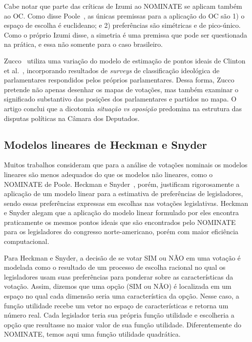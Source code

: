 \documentclass[
	article,			%
	12pt,				%
	oneside,			%
	a4paper,			%
	english,			%
	brazil,				%
	sumario=tradicional,
	oldfontcommands %
	]{abntex2}
\newcommand\todo[1]{\nb{ToDo}{#1}}
\newcommand\nay{NÃO\xspace}
\newcommand\yea{SIM\xspace}
\newcommand\nominate{NOMINATE\xspace}
\begin{document}
Cabe notar que parte das críticas de Izumi ao \nominate se aplicam também ao OC. Como disse Poole~\cite{poole2000oc}, as únicas premissas para a aplicação do OC são 1) o espaço de escolha é euclideano; e 2) preferências são simétricas e de pico-único. Como o próprio Izumi disse, a simetria é uma premissa que pode ser questionada na prática, e essa não somente para o caso brasileiro.

Zucco~\cite{zucco2011ideologia} utiliza uma variação do modelo de estimação de pontos ideais de Clinton et al.~\cite{clinton2004ideal}, incorporando resultados de \emph{surveys} de classificação ideológica de parlamentares respondidos pelos próprios parlamentares. Dessa forma, Zucco pretende não apenas desenhar os mapas de votações, mas também examinar o significado substantivo das posições dos parlamentares e partidos no mapa. O artigo conclui que a dicotomia \emph{situação vs oposição} predomina na estrutura das disputas políticas na Câmara dos Deputados.

\todo{zucco2011distinguishing}



\subsection{Modelos lineares de Heckman e Snyder}

Muitos trabalhos consideram que para a análise de votações nominais os modelos lineares são menos adequados do que os modelos não lineares, como o \nominate de Poole. Heckman e Snyder~\cite{heckman-snyder1997}, porém, justificam rigorosamente a aplicação de um modelo linear para a estimativa de preferências de legisladores, sendo essas preferências expressas em escolhas nas votações legislativas. Heckman e Snyder alegam que a aplicação do modelo linear formulado por eles encontra praticamente os mesmos pontos ideais que são encontrados pelo \nominate para os legisladores do congresso norte-americano, porém com maior eficiência computacional.

Para Heckman e Snyder, a decisão de se votar \yea ou \nay em uma votação é modelada como o resultado de um processo de escolha racional no qual os legisladores usam suas preferências para ponderar sobre as características da votação. Assim, dizemos que uma opção (\yea ou \nay) é localizada em um espaço no qual cada dimensão seria uma característica da opção. Nesse caso, a função utilidade recebe um vetor no espaço de características e retorna um número real. Cada legislador teria sua própria função utilidade e escolheria a opção que resultasse no maior valor de sua função utilidade. Diferentemente do NOMINATE, temos aqui uma função utilidade quadrática.
\end{document}
